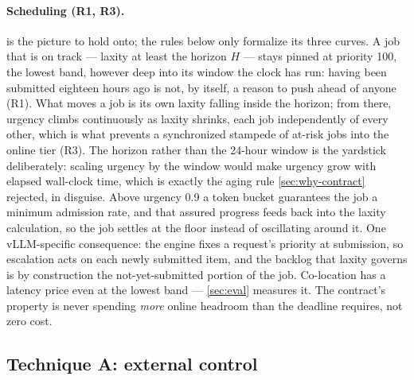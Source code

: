 \documentclass[11pt]{article}
\begin{document}
\paragraph{Scheduling (R1, R3).}  is the picture to hold onto; the
rules below only formalize its three curves. A job that is on track --- laxity at least
the horizon $H$ --- stays pinned at priority 100, the lowest band, however deep into its
window the clock has run: having been submitted eighteen hours ago is not, by itself, a
reason to push ahead of anyone (R1). What moves a job is its own laxity falling inside
the horizon; from there, urgency climbs continuously as laxity shrinks, each job
independently of every other, which is what prevents a synchronized stampede of at-risk
jobs into the online tier (R3). The horizon rather than the 24-hour window is the
yardstick deliberately: scaling urgency by the window would make urgency grow with
elapsed wall-clock time, which is exactly the aging rule \cref{sec:why-contract}
rejected, in disguise. Above urgency 0.9 a token bucket guarantees the job a minimum
admission rate, and that assured progress feeds back into the laxity calculation, so
the job settles at the floor instead of oscillating around it. One vLLM-specific
consequence: the engine fixes a request's priority at submission, so escalation acts on
each newly submitted item, and the backlog that laxity governs is by construction the
not-yet-submitted portion of the job. Co-location has a latency price even at the
lowest band --- \cref{sec:eval} measures it. The contract's property is never spending
\emph{more} online headroom than the deadline requires, not zero cost.



\subsection{Technique A: external control}
\label{sec:tech-a}
\end{document}
